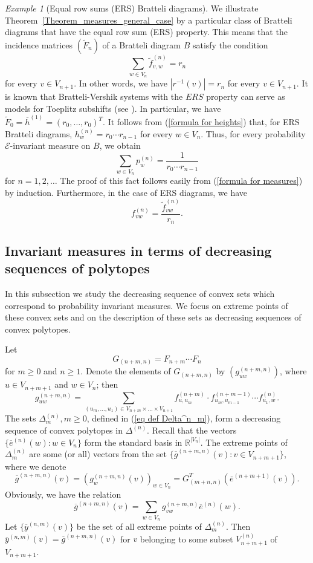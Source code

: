 \documentclass[11pt, english, reqno]{amsart}
\theoremstyle{definition}
\theoremstyle{remark}
\newtheorem{example}[defin]{Example}
\theoremstyle{plain}
\def\wt{\widetilde}
\def\ov{\overline}
\def\tl{\widetilde}
\numberwithin{equation}{section}
\begin{document}
\begin{example}[Equal row sums (ERS) Bratteli diagrams]
\label{ExampleERS1}We illustrate  Theorem~\ref{Theorem_measures_general_case}
 by a particular class
of Bratteli diagrams that have  the equal row sum (ERS) property.
This  means that the  incidence matrices $(\wt F_n)$ of a Bratteli diagram
$B$ satisfy the condition
  $$
  \sum_{w \in V_n} \tl f_{v,w}^{(n)} = r_n
  $$
  for every $v \in V_{n+1}$. In other words, we have $|r^{-1}(v)| = r_n$ for every $v \in V_{n+1}$. It is known that Bratteli-Vershik
   systems with the $ERS$ property can serve as models for
   Toeplitz subshifts   (see \cite{GjerdeJohansen2000}).
In particular, we have $\wt F_0 = \ov h^{(1)} = (r_0, \ldots, r_0)^T$.
 It follows from (\ref{formula for heights}) that, for ERS Bratteli diagrams,
  $h^{(n)}_w = r_0 \cdots r_{n-1}$ for every $w \in V_n$.
Thus, for every probability $\mathcal{E}$-invariant measure on $B$,
 we obtain
$$
\sum_{w \in V_n} p_w^{(n)} = \frac{1}{r_0 \cdots r_{n-1}}
$$
for $n = 1, 2, \ldots$ The proof of this fact follows easily from
 (\ref{formula for measures}) by induction.  Furthermore, in the case
 of ERS diagrams, we have
$$
f_{vw}^{(n)} = \frac{\tl f_{vw}^{(n)}}{r_n}.
$$
\end{example}


\subsection{Invariant measures in terms of decreasing sequences of polytopes}

In this subsection we  study the decreasing sequence of convex sets which
correspond  to probability invariant measures.
We  focus on  extreme points of these convex sets and on the description of
 these sets  as decreasing sequences of convex polytopes.

Let
$$
G_{(n+m,n)} = F_{n+m} \cdots F_{n}
$$
for $m \geq 0$ and $n \geq 1$.
Denote the elements of $G_{(n+m,n)}$ by $(g_{uw}^{(n+m,n)})$, where
$u \in V_{n+m+1}$ and $w\in V_{n}$; then
$$
g_{uw}^{(n+m,n)} = \sum_{(u_m, \ldots, u_1) \in V_{n+m}\times \ldots
 \times V_{n+1}} f^{(n+m)}_{u,u_m}\cdot f^{(n+m-1)}_{u_m,u_{m-1}}
 \cdots f^{(n)}_{u_1,w}.
$$
The sets $\Delta_m^{(n)}, m \geq 0$, defined in
(\ref{eq def Delta^n_m}),
form a decreasing sequence of convex polytopes in $\Delta^{(n)}$.
Recall that the vectors $\{\ov e^{(n)}(w) : w \in V_n\}$
form the standard basis in $\mathbb{R}^{|V_n|}$.
The extreme points of $\Delta_m^{(n)}$
are some (or all) vectors from the set $\{\ov g^{(n+m,n)}(v) :
v \in V_{n+m+1}\}$, where we denote
$$
\ov g^{(n+m,n)}(v) = (g_{w}^{(n+m,n)}(v))_{w \in V_n} =
G_{(m+n,n)}^T(\ov e^{(n+m+1)}(v)).
$$
Obviously, we have the relation
\begin{equation}\label{2.3}
\ov g^{(n+m,n)}(v) = \sum_{w \in V_n}g_{vw}^{(n+m,n)}\ov e^{(n)}(w).
\end{equation}
Let $\{\ov y^{(n,m)}(v)\}$ be the set of all extreme points of
$\Delta_m^{(n)}$.
Then $\ov y^{(n,m)}(v) = \ov g^{(n+m,n)}(v)$ for $v$ belonging
 to some subset $V_{n+m+1}^{(n)}$ of $V_{n+m+1}$.
\end{document}
